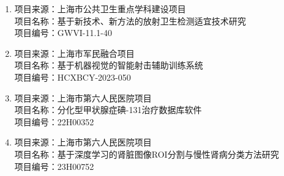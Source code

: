 \begin{projects}
      \begin{enumerate}
            \item 项目来源：上海市公共卫生重点学科建设项目 \\
                  项目名称：基于新技术、新方法的放射卫生检测适宜技术研究 \\
                  项目编号：GWVI-11.1-40
            \item 项目来源：上海市军民融合项目 \\
                  项目名称：基于机器视觉的智能射击辅助训练系统 \\
                  项目编号：HCXBCY-2023-050
            \item 项目来源：上海市第六人民医院项目 \\
                  项目名称：分化型甲状腺症碘-131治疗数据库软件 \\
                  项目编号：22H00352
            \item 项目来源：上海市第六人民医院项目 \\
                  项目名称：基于深度学习的肾脏图像ROI分割与慢性肾病分类方法研究 \\
                  项目编号：23H00752
      \end{enumerate}
\end{projects}